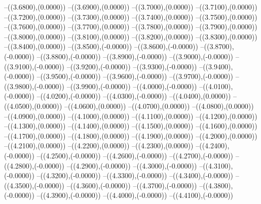 {	--({\sx*(3.6800)},{\sy*(0.0000)})
	--({\sx*(3.6900)},{\sy*(0.0000)})
	--({\sx*(3.7000)},{\sy*(0.0000)})
	--({\sx*(3.7100)},{\sy*(0.0000)})
	--({\sx*(3.7200)},{\sy*(0.0000)})
	--({\sx*(3.7300)},{\sy*(0.0000)})
	--({\sx*(3.7400)},{\sy*(0.0000)})
	--({\sx*(3.7500)},{\sy*(0.0000)})
	--({\sx*(3.7600)},{\sy*(0.0000)})
	--({\sx*(3.7700)},{\sy*(0.0000)})
	--({\sx*(3.7800)},{\sy*(0.0000)})
	--({\sx*(3.7900)},{\sy*(0.0000)})
	--({\sx*(3.8000)},{\sy*(0.0000)})
	--({\sx*(3.8100)},{\sy*(0.0000)})
	--({\sx*(3.8200)},{\sy*(0.0000)})
	--({\sx*(3.8300)},{\sy*(0.0000)})
	--({\sx*(3.8400)},{\sy*(0.0000)})
	--({\sx*(3.8500)},{\sy*(-0.0000)})
	--({\sx*(3.8600)},{\sy*(-0.0000)})
	--({\sx*(3.8700)},{\sy*(-0.0000)})
	--({\sx*(3.8800)},{\sy*(-0.0000)})
	--({\sx*(3.8900)},{\sy*(-0.0000)})
	--({\sx*(3.9000)},{\sy*(-0.0000)})
	--({\sx*(3.9100)},{\sy*(-0.0000)})
	--({\sx*(3.9200)},{\sy*(-0.0000)})
	--({\sx*(3.9300)},{\sy*(-0.0000)})
	--({\sx*(3.9400)},{\sy*(-0.0000)})
	--({\sx*(3.9500)},{\sy*(-0.0000)})
	--({\sx*(3.9600)},{\sy*(-0.0000)})
	--({\sx*(3.9700)},{\sy*(-0.0000)})
	--({\sx*(3.9800)},{\sy*(-0.0000)})
	--({\sx*(3.9900)},{\sy*(-0.0000)})
	--({\sx*(4.0000)},{\sy*(-0.0000)})
	--({\sx*(4.0100)},{\sy*(-0.0000)})
	--({\sx*(4.0200)},{\sy*(-0.0000)})
	--({\sx*(4.0300)},{\sy*(-0.0000)})
	--({\sx*(4.0400)},{\sy*(0.0000)})
	--({\sx*(4.0500)},{\sy*(0.0000)})
	--({\sx*(4.0600)},{\sy*(0.0000)})
	--({\sx*(4.0700)},{\sy*(0.0000)})
	--({\sx*(4.0800)},{\sy*(0.0000)})
	--({\sx*(4.0900)},{\sy*(0.0000)})
	--({\sx*(4.1000)},{\sy*(0.0000)})
	--({\sx*(4.1100)},{\sy*(0.0000)})
	--({\sx*(4.1200)},{\sy*(0.0000)})
	--({\sx*(4.1300)},{\sy*(0.0000)})
	--({\sx*(4.1400)},{\sy*(0.0000)})
	--({\sx*(4.1500)},{\sy*(0.0000)})
	--({\sx*(4.1600)},{\sy*(0.0000)})
	--({\sx*(4.1700)},{\sy*(0.0000)})
	--({\sx*(4.1800)},{\sy*(0.0000)})
	--({\sx*(4.1900)},{\sy*(0.0000)})
	--({\sx*(4.2000)},{\sy*(0.0000)})
	--({\sx*(4.2100)},{\sy*(0.0000)})
	--({\sx*(4.2200)},{\sy*(0.0000)})
	--({\sx*(4.2300)},{\sy*(0.0000)})
	--({\sx*(4.2400)},{\sy*(-0.0000)})
	--({\sx*(4.2500)},{\sy*(-0.0000)})
	--({\sx*(4.2600)},{\sy*(-0.0000)})
	--({\sx*(4.2700)},{\sy*(-0.0000)})
	--({\sx*(4.2800)},{\sy*(-0.0000)})
	--({\sx*(4.2900)},{\sy*(-0.0000)})
	--({\sx*(4.3000)},{\sy*(-0.0000)})
	--({\sx*(4.3100)},{\sy*(-0.0000)})
	--({\sx*(4.3200)},{\sy*(-0.0000)})
	--({\sx*(4.3300)},{\sy*(-0.0000)})
	--({\sx*(4.3400)},{\sy*(-0.0000)})
	--({\sx*(4.3500)},{\sy*(-0.0000)})
	--({\sx*(4.3600)},{\sy*(-0.0000)})
	--({\sx*(4.3700)},{\sy*(-0.0000)})
	--({\sx*(4.3800)},{\sy*(-0.0000)})
	--({\sx*(4.3900)},{\sy*(-0.0000)})
	--({\sx*(4.4000)},{\sy*(-0.0000)})
	--({\sx*(4.4100)},{\sy*(-0.0000)})
}
